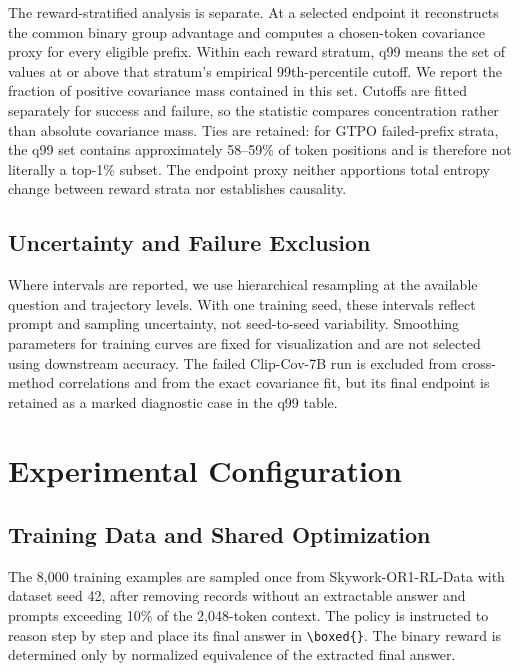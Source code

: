 \documentclass[letterpaper]{article}
\begin{document}
The reward-stratified analysis is separate.  At a selected endpoint it
reconstructs the common binary group advantage and computes a chosen-token
covariance proxy for every eligible prefix.  Within each reward stratum, q99
means the set of values at or above that stratum's empirical 99th-percentile
cutoff.  We report the fraction of positive covariance mass contained in this
set.  Cutoffs are fitted separately for success and failure, so the statistic
compares concentration rather than absolute covariance mass.  Ties are
retained: for GTPO failed-prefix strata, the q99 set contains approximately
58--59\% of token positions and is therefore not literally a top-1\% subset.
The endpoint proxy neither apportions total entropy change between reward
strata nor establishes causality.

\subsection{Uncertainty and Failure Exclusion}

Where intervals are reported, we use hierarchical resampling at the available
question and trajectory levels.  With one training seed, these intervals
reflect prompt and sampling uncertainty, not seed-to-seed variability.
Smoothing parameters for training curves are fixed for visualization and are
not selected using downstream accuracy.  The failed Clip-Cov-7B run is
excluded from cross-method correlations and from the exact covariance fit,
but its final endpoint is retained as a marked diagnostic case in the q99
table.

\section{Experimental Configuration}

\subsection{Training Data and Shared Optimization}

The 8,000 training examples are sampled once from Skywork-OR1-RL-Data
\citep{skywork2025or1data} with dataset seed 42, after removing records
without an extractable answer and prompts exceeding 10\% of the 2,048-token
context.  The policy is instructed to reason step by step and place its final
answer in \verb|\boxed{}|.  The binary reward is determined only by normalized
equivalence of the extracted final answer.
\end{document}
